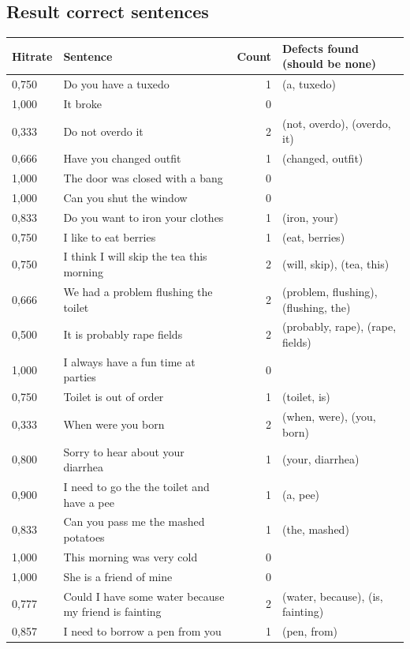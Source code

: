\documentclass[a4paper,12pt]{article}
\begin{document}
\begin{landscape}
\centering
\fontsize{10}{11}\selectfont
\section{Result correct sentences}
\pagestyle{empty}
\begin{longtable}{l l r l}
Hitrate & Sentence & Count & Defects found (should be none) \\
\hline
0,750 & Do you have a tuxedo & 1 & (a, tuxedo) \\
1,000 & It broke & 0 &  \\
0,333 & Do not overdo it & 2 & (not, overdo), (overdo, it) \\
0,666 & Have you changed outfit & 1 & (changed, outfit) \\
1,000 & The door was closed with a bang & 0 &  \\
1,000 & Can you shut the window & 0 &  \\
0,833 & Do you want to iron your clothes & 1 & (iron, your) \\
0,750 & I like to eat berries & 1 & (eat, berries) \\
0,750 & I think I will skip the tea this morning & 2 & (will, skip), (tea, this) \\
0,666 & We had a problem flushing the toilet & 2 & (problem, flushing), (flushing, the) \\
0,500 & It is probably rape fields & 2 & (probably, rape), (rape, fields) \\
1,000 & I always have a fun time at parties & 0 &  \\
0,750 & Toilet is out of order & 1 & (toilet, is) \\
0,333 & When were you born & 2 & (when, were), (you, born) \\
0,800 & Sorry to hear about your diarrhea & 1 & (your, diarrhea) \\
0,900 & I need to go the the toilet and have a pee & 1 & (a, pee) \\
0,833 & Can you pass me the mashed potatoes & 1 & (the, mashed) \\
1,000 & This morning was very cold & 0 &  \\
1,000 & She is a friend of mine & 0 &  \\
0,777 & Could I have some water because my friend is fainting & 2 & (water, because), (is, fainting) \\
0,857 & I need to borrow a pen from you & 1 & (pen, from) \\

\end{longtable}
\end{landscape}
\end{document}

